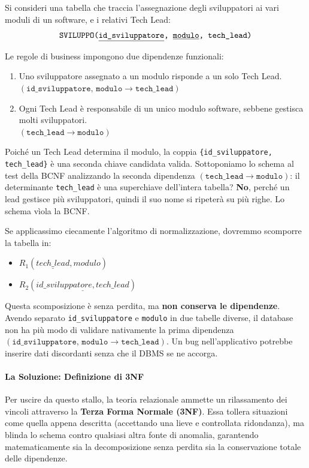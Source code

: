 \begin{example}
Si consideri una tabella che traccia l'assegnazione degli sviluppatori ai vari moduli di un software, e i relativi Tech Lead:
$$ \texttt{SVILUPPO(\underline{id\_sviluppatore}, \underline{modulo}, tech\_lead)} $$

Le regole di business impongono due dipendenze funzionali:
\begin{enumerate}
    \item Uno sviluppatore assegnato a un modulo risponde a un solo Tech Lead. \\
    $(\texttt{id\_sviluppatore, modulo} \rightarrow \texttt{tech\_lead})$
    \item Ogni Tech Lead è responsabile di un unico modulo software, sebbene gestisca molti sviluppatori. \\
    $(\texttt{tech\_lead} \rightarrow \texttt{modulo})$
\end{enumerate}

Poiché un Tech Lead determina il modulo, la coppia \texttt{\{id\_sviluppatore, tech\_lead\}} è una seconda chiave candidata valida. 
Sottoponiamo lo schema al test della BCNF analizzando la seconda dipendenza $(\texttt{tech\_lead} \rightarrow \texttt{modulo})$: il determinante \texttt{tech\_lead} è una superchiave dell'intera tabella? \textbf{No}, perché un lead gestisce più sviluppatori, quindi il suo nome si ripeterà su più righe. Lo schema vìola la BCNF.

Se applicassimo ciecamente l'algoritmo di normalizzazione, dovremmo scomporre la tabella in:
\begin{itemize}
    \item $R_1(\underline{tech\_lead}, modulo)$
    \item $R_2(\underline{id\_sviluppatore, tech\_lead})$
\end{itemize}
Questa scomposizione è senza perdita, ma \textbf{non conserva le dipendenze}. Avendo separato \texttt{id\_sviluppatore} e \texttt{modulo} in due tabelle diverse, il database non ha più modo di validare nativamente la prima dipendenza $(\texttt{id\_sviluppatore, modulo} \rightarrow \texttt{tech\_lead})$. Un bug nell'applicativo potrebbe inserire dati discordanti senza che il DBMS se ne accorga.
\end{example}

\paragraph{La Soluzione: Definizione di 3NF}
Per uscire da questo stallo, la teoria relazionale ammette un rilassamento dei vincoli attraverso la \textbf{Terza Forma Normale (3NF)}. Essa tollera situazioni come quella appena descritta (accettando una lieve e controllata ridondanza), ma blinda lo schema contro qualsiasi altra fonte di anomalia, garantendo matematicamente sia la decomposizione senza perdita sia la conservazione totale delle dipendenze.

